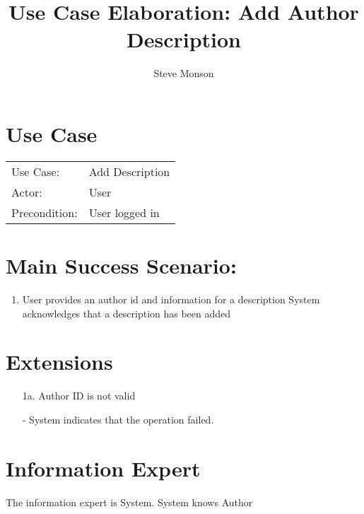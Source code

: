 \documentclass{article}
\title{Use Case Elaboration: Add Author Description}
\author{ Steve Monson }
\begin{document}
\maketitle


\section*{Use Case}
\begin{tabular}{l l}
Use Case:     & Add Description\\
Actor:        & User\\
Precondition: & User logged in\\
\end{tabular}


\section*{Main Success Scenario:}

\begin{enumerate}
    \item User provides an author id and information for a description
    \itme System acknowledges that a description has been added
 
\end{enumerate}

\section*{Extensions}

\begin{itemize}
    \item [1a.] Author ID is not valid
    
         - System indicates that the operation failed.
                            
\end{itemize}


\section*{Information Expert}
The information expert is System. System knows Author
\end{document}
